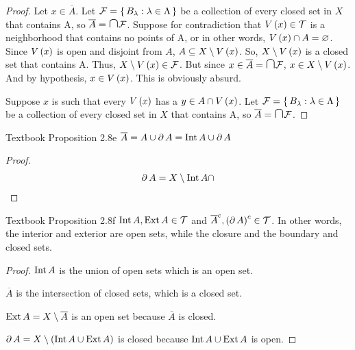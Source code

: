 \documentclass{article}
\begin{document}
\begin{proof}
    \forwarddir Let $x \in \overline{A}$. Let $\mathcal{F} = \set{B_\lambda: \lambda \in \Lambda}$
    be a collection of every closed set in $X$ that contains A, so $\overline{A} = \medcap \mc F$.
    Suppose for contradiction that $V\left(x\right) \in \mathcal{T}$ is a neighborhood that contains
    no points of A, or in other words, $V\left(x\right) \cap A = \varnothing$. Since $V\left(x\right)$ is open
    and disjoint from $A$, $A \subseteq X\setminus V\left(x\right)$. So, $X \setminus V\left(x\right)$ is a
    closed set that contains A. Thus, $X \setminus V\left(x\right) \in \mathcal{F}$. But since $x \in \overline{A} = \medcap \mc F$, $x \in X \setminus V\left(x\right)$. And by hypothesis, $x \in V\left(x\right)$. This is obviously absurd.

    \conversedir Suppose $x$ is such that every $V\left(x\right)$ has a $y \in A \cap V\left(x\right)$.
    Let $\mathcal{F} = \set{B_\lambda: \lambda \in \Lambda}$
    be a collection of every closed set in $X$ that contains A, so $\overline{A} = \medcap \mc F$.
\end{proof}
\begin{proposition}{Textbook Proposition 2.8e}
\label{book:prop:2.8e}
    $\overline{A} = A \cup \partial \, A = \textnormal{Int} \, A \cup \partial \, A$
\end{proposition}
\begin{proof}
    \begin{align*}
        \partial \, A = X \setminus \textnormal{Int} \, A \cap  
    \end{align*}
\end{proof}
\begin{proposition}{Textbook Proposition 2.8f}
\label{book:prop:2.8f}
    $\textnormal{Int} \, A, \textnormal{Ext} \, A \in \mathcal{T}$ and $\overline{A}^c, \left(\partial \, A\right)^c \in \mathcal{T}$.
    In other words, the interior and exterior are open sets, while the closure and the boundary and closed sets.
\end{proposition}
\begin{proof}
    $\textnormal{Int} \, A$ is the union of open sets which is an open set.

    $\overline{A}$ is the intersection of closed sets, which is a closed set.

    $\textnormal{Ext} \, A = X \setminus \overline{A}$ is an open set because $\overline{A}$ is closed.

    $\partial \, A = X \setminus \left(\textnormal{Int} \, A \cup \textnormal{Ext} \, A\right)$ is closed because
    $\textnormal{Int} \, A \cup \textnormal{Ext} \, A$ is open.
\end{proof}
\end{document}
